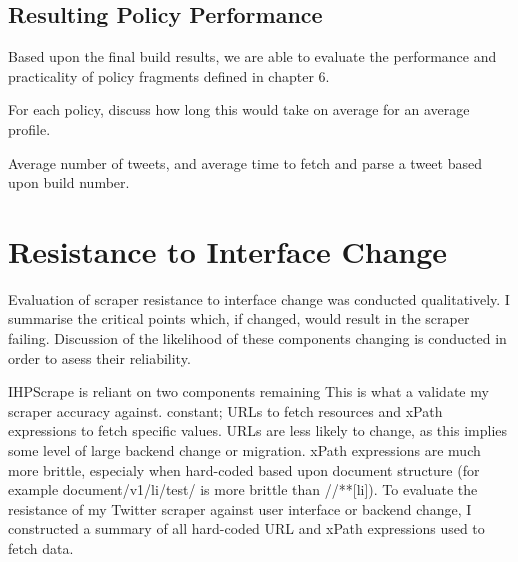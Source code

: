 




\subsection{Resulting Policy Performance}

Based upon the final build results, we are able to evaluate the performance and practicality of policy fragments defined in chapter 6. 

For each policy, discuss how long this would take on average for an average profile.

Average number of tweets, and average time to fetch and parse a tweet based upon build number. 

\section{Resistance to Interface Change}

Evaluation of scraper resistance to interface change was conducted qualitatively. I summarise the critical points which, if changed, would result in the scraper failing. Discussion of the likelihood of these components changing is conducted in order to asess their reliability. 

IHPScrape is reliant on two components remaining This is what a validate my scraper accuracy against. 
constant; URLs to fetch resources and xPath expressions to fetch specific values. URLs are less likely to change, as this implies some level of large backend change or migration. xPath expressions are much more brittle, especialy when hard-coded based upon document structure (for example document/v1/li/test/ is more brittle than //**[li]). To evaluate the resistance of my Twitter scraper against user interface or backend change, I constructed a summary of all hard-coded URL and xPath expressions used to fetch data.

